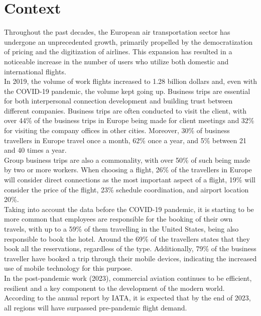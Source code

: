 \documentclass[../memory.tex]{subfiles}
\begin{document}
\section{Context}
Throughout the past decades, the European air transportation sector has
undergone an unprecedented growth, primarily propelled by the democratization of
pricing and the digitization of airlines. This expansion has resulted in a
noticeable increase in the number of users who utilize both domestic and
international flights.
\\[8pt]
In 2019, the volume of work flights increased to 1.28 billion
dollars\cite{flight-volume} and, even with the COVID-19 pandemic, the volume
kept going up\cite{covid-flight-volume}. Business trips are essential for both
interpersonal connection development and building trust between different
companies\cite{company-trust}. Business trips are often conducted to visit
the client, with over 44\% of the business trips in Europe being made for
client meetings and 32\% for visiting the company offices in other
cities\cite{visit-client}. Moreover, 30\% of business travellers in Europe travel
once a month, 62\% once a year, and 5\% between 21 and 40 times a
year\cite{visit-client}.
\\[8pt]
Group business trips are also a commonality, with over 50\% of such being made
by two or more workers\cite{visit-client}. When choosing a flight, 26\% of the
travellers in Europe will consider direct connections as the most important
aspect of a flight, 19\% will consider the price of the flight, 23\% schedule
coordination, and airport location 20\%\cite{visit-client}.
\\[8pt]
Taking into account the data before the COVID-19 pandemic, it is starting to be
more common that employees are responsible for the booking of their own travels,
with up to a 59\% of them travelling in the United States, being also
responsible to book the hotel\cite{employee-books}. Around the 69\% of the
travellers states that they book all the reservations, regardless of the type.
Additionally, 79\% of the business traveller have booked a trip through their
mobile devices, indicating the increased use of mobile technology for this
purpose\cite{mobile-booking}.
\\[8pt]
In the post-pandemic work (2023), commercial aviation continues to be efficient,
resilient and a key component to the development of the modern world. According
to the annual report by IATA\cite{iata-report}, it is expected that by the end
of 2023, all regions will have surpassed pre-pandemic flight demand.
\end{document}
